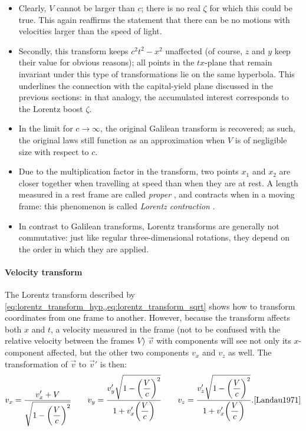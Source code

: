 \begin{itemize}
    \item Clearly, \(V\) cannot be larger than \(c\); there is no real \(\zeta\) for which this could be true. This again reaffirms the statement that there can be no motions with velocities larger than the speed of light.
    \item Secondly, this transform keeps \(c^2t^2 - x^2\) unaffected (of course, \(z\) and \(y\) keep their value for obvious reasons); all points in the \(tx\)-plane that remain invariant under this type of transformations lie on the same hyperbola. This underlines the connection with the capital-yield plane discussed in the previous sections: in that analogy, the accumulated interest corresponds to the Lorentz boost \(\zeta\).
    \item In the limit for \(c \to \infty\), the original Galilean transform is recovered; as such, the original laws still function as an approximation when \(V\) is of negligible size with respect to \(c\).
    \item Due to the multiplication factor in the transform, two points \(x_1\) and \(x_2\) are closer together when travelling at speed than when they are at rest. A length measured in a rest frame are called \emph{proper} , and contracts when in a moving frame: this phenomenon is called \emph{Lorentz contraction}  \cite{Landau1971}.
    \item In contrast to Galilean transforms, Lorentz transforms are generally not commutative: just like regular three-dimensional rotations, they depend on the order in which they are applied.
\end{itemize}
\paragraph{Velocity transform} The Lorentz transform described by \cref{eq:lorentz_transform_hyp,,eq:lorentz_transform_sqrt} shows how to transform coordinates from one frame to another. However, because the transform affects both \(x\) and \(t\), a velocity measured in the frame (not to be confused with the relative velocity between the frames \(V\)) \(\vec{v}\) with components will see not only its \(x\)-component affected, but the other two components \(v_x\) and \(v_z\) as well. The transformation of \(\vec{v}\) to \(\vec{v}'\) is then:
\begin{equation}
    v_x = \frac{\displaystyle v_x' + V}{\displaystyle \sqrt{1 - \qty(\frac{V}{c})^2}}\qquad 
    v_y = \frac{\displaystyle v_y'\sqrt{1 - \qty(\frac{V}{c})^2}}{\displaystyle 1 + v_x'
    \qty(\frac{V}{c})}\qquad
    v_z = \frac{\displaystyle v_z'\sqrt{1 - \qty(\frac{V}{c})^2}}{\displaystyle 1 + v_x'\qty(\frac{V}{c})}. \text{\cite{Landau1971}}
    \label{eq:lorentz_transform_vel}
\end{equation}


